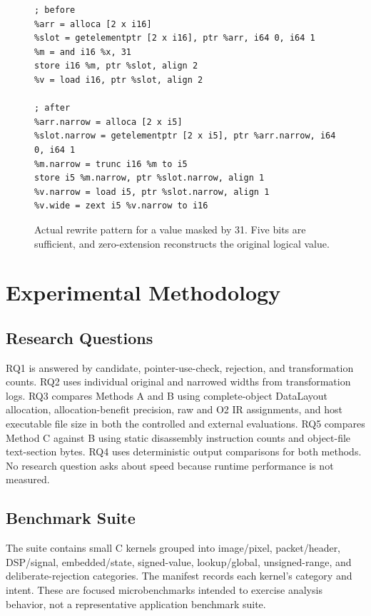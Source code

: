 \documentclass[11pt,twocolumn]{article}
\begin{document}
\begin{figure}[t]
\centering
\begin{minipage}{0.98\columnwidth}
\begin{lstlisting}
; before
%arr = alloca [2 x i16]
%slot = getelementptr [2 x i16], ptr %arr, i64 0, i64 1
%m = and i16 %x, 31
store i16 %m, ptr %slot, align 2
%v = load i16, ptr %slot, align 2

; after
%arr.narrow = alloca [2 x i5]
%slot.narrow = getelementptr [2 x i5], ptr %arr.narrow, i64 0, i64 1
%m.narrow = trunc i16 %m to i5
store i5 %m.narrow, ptr %slot.narrow, align 1
%v.narrow = load i5, ptr %slot.narrow, align 1
%v.wide = zext i5 %v.narrow to i16
\end{lstlisting}
\end{minipage}
\caption{Actual rewrite pattern for a value masked by 31. Five bits are
sufficient, and zero-extension reconstructs the original logical value.}
\label{fig:rewrite}
\end{figure}

\section{Experimental Methodology}

\subsection{Research Questions}

RQ1 is answered by candidate, pointer-use-check, rejection, and transformation counts. RQ2 uses
individual original and narrowed widths from transformation logs. RQ3 compares
Methods A and B using complete-object DataLayout allocation, allocation-benefit
precision, raw and O2 IR assignments, and host executable file size in both the
controlled and external evaluations. RQ5 compares Method C against B using
static disassembly instruction counts and object-file text-section bytes.
RQ4 uses deterministic output comparisons
for both methods. No research question asks about speed because runtime
performance is not measured.

\subsection{Benchmark Suite}

The suite contains \BenchmarkCount{} small C kernels grouped into image/pixel,
packet/header, DSP/signal, embedded/state, signed-value, lookup/global,
unsigned-range, and deliberate-rejection categories. The manifest records each
kernel's category and intent. These are focused microbenchmarks intended to
exercise analysis behavior, not a representative application benchmark suite.
\end{document}
